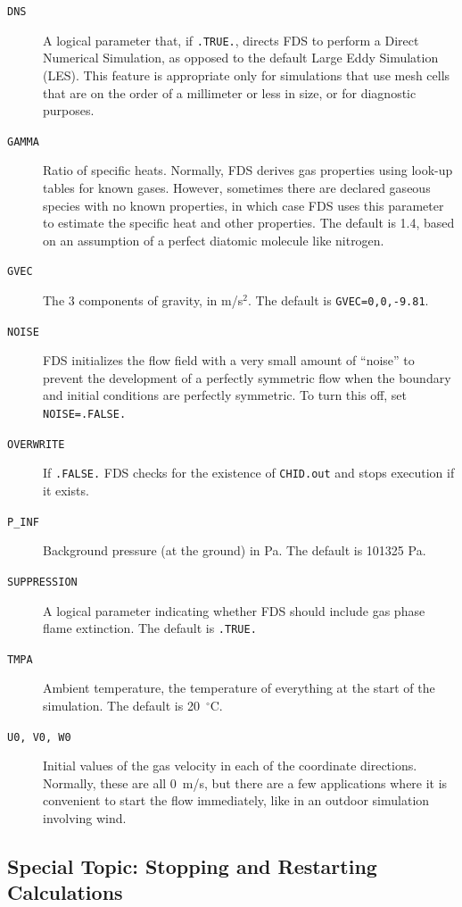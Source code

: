 \documentclass[11pt]{book}
\newcommand{\ct}{\tt\small}
\begin{document}
\begin{description}
\item[{\ct DNS}] A logical parameter that, if {\ct .TRUE.}, directs FDS to perform a Direct Numerical Simulation,
as opposed to the default Large Eddy Simulation (LES). This feature is appropriate only for simulations that use mesh cells that are
on the order of a millimeter or less in size, or for diagnostic purposes.
\item[{\ct GAMMA}] Ratio of specific heats. Normally, FDS derives gas properties using look-up tables for known gases. However, sometimes there
are declared gaseous species with no known properties, in which case FDS uses this parameter to estimate the specific heat and other properties. The default is
1.4, based on an assumption of a perfect diatomic molecule like nitrogen.
\item[{\ct GVEC}] The 3 components of gravity, in m/s$^2$. The default is {\ct GVEC=0,0,-9.81}.
\item[{\ct NOISE}] FDS initializes the flow field with a very small amount of ``noise'' to prevent the
development of a perfectly symmetric flow when the boundary
and initial conditions are perfectly symmetric. To turn this off, set {\ct NOISE=.FALSE.}
\item[{\ct OVERWRITE}] If {\ct .FALSE.} FDS checks for the existence of  {\ct CHID.out} and stops execution if it exists.
\item[{\ct P\_INF}] Background pressure (at the ground) in Pa. The default is 101325 Pa.
\item[{\ct SUPPRESSION}] A logical parameter indicating whether FDS should include gas phase flame extinction. The default is {\ct .TRUE.}
\item[{\ct TMPA}] Ambient temperature, the temperature of everything at the start of the simulation. The default is 20~$^\circ$C.
\item[{\ct U0, V0, W0}] Initial values of the gas velocity in each of the coordinate directions. Normally, these are all 0~m/s, but there are a few applications where it is
convenient to start the flow immediately, like in an outdoor simulation involving wind.
\end{description}

\subsection{Special Topic: Stopping and Restarting Calculations}
\label{info:restart}
\end{document}
